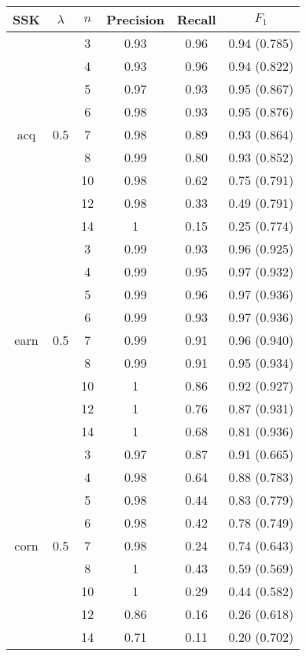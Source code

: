 \begin{table}
	\centering
	\begin{tabular}{| c | c | c | c | c | c | }
		\hline SSK&$ \lambda $& $ n $ & Precision & Recall & $ F_1 $   \\ \hline
		
		
		
		
		&& 3 & 0.93 & 0.96 & 0.94 (0.785)    \\ 
		&& 4 & 0.93 & 0.96 &  0.94  (0.822)  \\
			&& 5 & 0.97 & 0.93 & 0.95  (0.867)   \\ 
		&& 6 & 0.98 & 0.93 & 0.95 (0.876)    \\
	acq	&0.5& 7 & 0.98 & 0.89 & 0.93 (0.864)    \\
		&& 8 & 0.99 & 0.80 & 0.93  (0.852)   \\
		&& 10 & 0.98 & 0.62 & 0.75  (0.791)   \\
		&& 12 & 0.98 & 0.33 & 0.49  (0.791)   \\
		&& 14 & 1 & 0.15 & 0.25  (0.774)   \\ \hline
		
		
		
		&& 3 & 0.99 & 0.93 & 0.96  (0.925)   \\ 
	&& 4 & 0.99 & 0.95 &  0.97  (0.932) \\
	&	& 5 & 0.99 & 0.96 & 0.97   (0.936)  \\ 
	&& 6 & 0.99 & 0.93 & 0.97  (0.936)   \\
	earn&0.5& 7 & 0.99 & 0.91 & 0.96 (0.940)    \\
	&& 8 & 0.99 & 0.91 & 0.95  (0.934)   \\
	&& 10 & 1 & 0.86 & 0.92  (0.927)   \\
	&& 12 & 1 & 0.76 & 0.87  (0.931)   \\
	&& 14 & 1 & 0.68 & 0.81  (0.936)   \\ \hline
	
		
		&& 3 & 0.97 & 0.87 & 0.91  (0.665)   \\ 
		&& 4 & 0.98 & 0.64 & 0.88  (0.783)   \\ 
		&	& 5 & 0.98 & 0.44 &  0.83  (0.779)  \\ 
		&& 6 & 0.98 & 0.42 & 0.78   (0.749)  \\ 
		corn&0.5& 7 & 0.98 & 0.24 & 0.74  (0.643)  \\ 
		&& 8 & 1 & 0.43& 0.59  (0.569)   \\ 
		&& 10 & 1 & 0.29& 0.44  (0.582)   \\ 
		&& 12 & 0.86 & 0.16& 0.26  (0.618)   \\ 
		&& 14 & 0.71 & 0.11& 0.20  (0.702)   \\ 
								\hline
		

\end{tabular}
\end{table}
